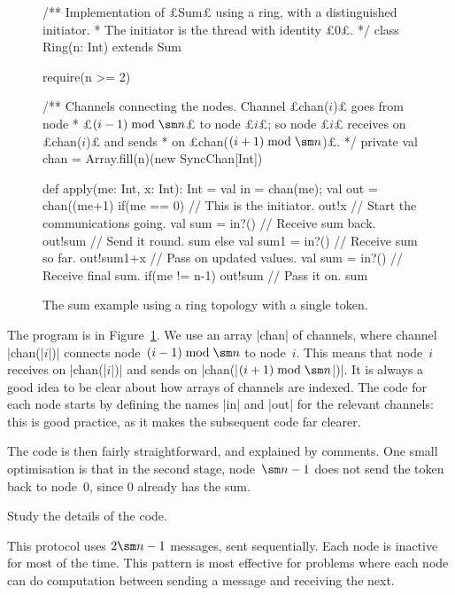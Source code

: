 \begin{figure}
\begin{scala}
/** Implementation of £Sum£ using a ring, with a distinguished initiator.
  * The initiator is the thread with identity £0£. */
class Ring(n: Int) extends Sum{
  require(n >= 2)

  /** Channels connecting the nodes.  Channel £chan($i$)£ goes from node
    * £$(i-1)\bmod \sm n$£ to node £$i$£; so node £$i$£ receives on £chan($i$)£ and sends
    * on £chan($(i+1)\bmod \sm n$)£. */
  private val chan = Array.fill(n)(new SyncChan[Int])
 
  def apply(me: Int, x: Int): Int = {
    val in = chan(me); val out = chan((me+1)%
    if(me == 0){                  // This is the initiator.
      out!x                       // Start the communications going.
      val sum = in?()             // Receive sum back.
      out!sum                     // Send it round.
      sum
    }
    else{
      val sum1 = in?()            // Receive sum so far.
      out!sum1+x                  // Pass on updated values.
      val sum = in?()             // Receive final sum.
      if(me != n-1) out!sum   // Pass it on.
      sum
    }
  } 
}
\end{scala}
\caption{The sum example using a ring topology with a single token.}
\label{fig:sum-ring1}
\end{figure}


The program is in Figure~\ref{fig:sum-ring1}.  We use an array |chan| of
channels, where channel |chan(|$i$|)| connects node~$(i-1)\bmod \sm n$ to
node~$i$.  This means that node~$i$ receives on |chan(|$i$|)| and sends on
|chan(|$(i+1)\bmod \sm n$|)|.  It is always a good idea to be clear about how
arrays of channels are indexed.  The code for each node starts by defining the
names |in| and |out| for the relevant channels: this is good practice, as it
makes the subsequent code far clearer.

The code is then fairly straightforward, and explained by comments.  One small
optimisation is that in the second stage, node~$\sm n - 1$ does not send the
token back to node~$0$, since $0$ already has the sum.
%
\begin{instruction}
Study the details of the code. 
\end{instruction}

This protocol uses $2\sm n-1$ messages, sent sequentially.  Each node is
inactive for most of the time.  This pattern is most effective for problems
where each node can do computation between sending a message and receiving the
next. 


